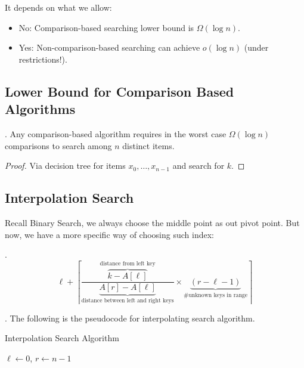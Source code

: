 \documentclass{article}
\begin{document}
\begin{solution}
    It depends on what we allow: \begin{itemize}
        \item No: Comparison-based searching lower bound is $\Omega(\log n)$. 
        \item Yes: Non-comparison-based searching can achieve $o(\log n)$ (under restrictions!).
    \end{itemize}
\end{solution}

\subsection{Lower Bound for Comparison Based Algorithms} 

\begin{thmm}[].
    Any comparison-based algorithm requires in the worst case $\Omega(\log n)$ comparisons to search among $n$ distinct items.
\end{thmm}

\begin{proof}
    Via decision tree for items $x_0, \ldots, x_{n-1}$ and search for $k$. 
\end{proof}

\subsection{Interpolation Search}

Recall Binary Search, we always choose the middle point as out pivot point. But now, we have a more specific way of choosing such index: 

\begin{discovery}[].
    \[ \ell + \left\lceil \frac{ \overbrace{ k - A[\ell] }^{\text{distance from left key}} }{ \underbrace{ A[r] - A[\ell] }_{\text{distance between left and right keys}} } \times \underbrace{ (r - \ell - 1) }_{\text{\# unknown keys in range}} \right\rceil \]
\end{discovery}

\begin{codes}[].
    The following is the pseudocode for interpolating search algorithm. \\
    \begin{algorithm}[H]
        \DontPrintSemicolon %
        \caption{Interpolation Search Algorithm}
    
        $\ell \gets 0$, \qquad $r \gets n - 1$\;
    \end{algorithm}
\end{codes}
\end{document}
